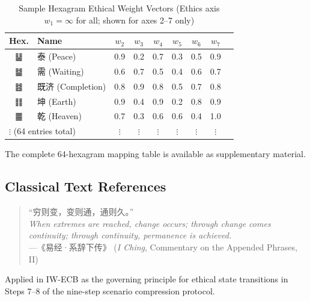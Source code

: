 \documentclass[conference]{IEEEtran}
\begin{document}
\begin{table}[!ht]
\caption{Sample Hexagram Ethical Weight Vectors
(Ethics axis $w_1 = \infty$ for all; shown for
axes 2--7 only)}
\label{tab:hexmap}
\centering
\small
\begin{tabular}{clccccccc}
\toprule
\textbf{Hex.}
  & \textbf{Name}
  & $w_2$ & $w_3$ & $w_4$ & $w_5$ & $w_6$ & $w_7$ \\
\midrule
䷊ & 泰 (Peace)
  & 0.9 & 0.2 & 0.7 & 0.3 & 0.5 & 0.9 \\
䷄ & 需 (Waiting)
  & 0.6 & 0.7 & 0.5 & 0.4 & 0.6 & 0.7 \\
䷾ & 既济 (Completion)
  & 0.8 & 0.9 & 0.8 & 0.5 & 0.7 & 0.8 \\
䷁ & 坤 (Earth)
  & 0.9 & 0.4 & 0.9 & 0.2 & 0.8 & 0.9 \\
䷀ & 乾 (Heaven)
  & 0.7 & 0.3 & 0.6 & 0.6 & 0.4 & 1.0 \\
\midrule
\multicolumn{2}{l}{$\vdots$ (64 entries total)}
  & $\vdots$ & $\vdots$ & $\vdots$
  & $\vdots$ & $\vdots$ & $\vdots$ \\
\bottomrule
\end{tabular}
\end{table}

The complete 64-hexagram mapping table is available as
supplementary material.

\subsection{Classical Text References}

\begin{quote}
``穷则变，变则通，通则久。''\\
\textit{When extremes are reached, change occurs;
through change comes continuity;
through continuity, permanence is achieved.}\\
\hfill---《易经·系辞下传》
(\textit{I Ching}, Commentary on the Appended Phrases, II)
\end{quote}

Applied in IW-ECB as the governing principle for
ethical state transitions in Steps 7--8 of the
nine-step scenario compression protocol.
\end{document}
